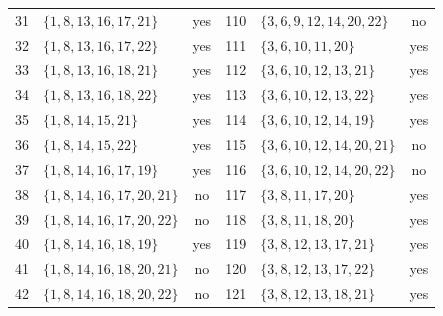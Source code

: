 \documentclass[aps,pra,reprint,superscriptaddress,longbibliography,nofootinbib,floatfix,10pt]{revtex4-2}
\theoremstyle{definition}
\begin{document}
\begin{longtable}{rlc@{\qquad}rlc}
31 & $\{1,\allowbreak 8,\allowbreak 13,\allowbreak 16,\allowbreak 17,\allowbreak 21\}$ & yes & 110 & $\{3,\allowbreak 6,\allowbreak 9,\allowbreak 12,\allowbreak 14,\allowbreak 20,\allowbreak 22\}$ & no\\
32 & $\{1,\allowbreak 8,\allowbreak 13,\allowbreak 16,\allowbreak 17,\allowbreak 22\}$ & yes & 111 & $\{3,\allowbreak 6,\allowbreak 10,\allowbreak 11,\allowbreak 20\}$ & yes\\
33 & $\{1,\allowbreak 8,\allowbreak 13,\allowbreak 16,\allowbreak 18,\allowbreak 21\}$ & yes & 112 & $\{3,\allowbreak 6,\allowbreak 10,\allowbreak 12,\allowbreak 13,\allowbreak 21\}$ & yes\\
34 & $\{1,\allowbreak 8,\allowbreak 13,\allowbreak 16,\allowbreak 18,\allowbreak 22\}$ & yes & 113 & $\{3,\allowbreak 6,\allowbreak 10,\allowbreak 12,\allowbreak 13,\allowbreak 22\}$ & yes\\
35 & $\{1,\allowbreak 8,\allowbreak 14,\allowbreak 15,\allowbreak 21\}$ & yes & 114 & $\{3,\allowbreak 6,\allowbreak 10,\allowbreak 12,\allowbreak 14,\allowbreak 19\}$ & yes\\
36 & $\{1,\allowbreak 8,\allowbreak 14,\allowbreak 15,\allowbreak 22\}$ & yes & 115 & $\{3,\allowbreak 6,\allowbreak 10,\allowbreak 12,\allowbreak 14,\allowbreak 20,\allowbreak 21\}$ & no\\
37 & $\{1,\allowbreak 8,\allowbreak 14,\allowbreak 16,\allowbreak 17,\allowbreak 19\}$ & yes & 116 & $\{3,\allowbreak 6,\allowbreak 10,\allowbreak 12,\allowbreak 14,\allowbreak 20,\allowbreak 22\}$ & no\\
38 & $\{1,\allowbreak 8,\allowbreak 14,\allowbreak 16,\allowbreak 17,\allowbreak 20,\allowbreak 21\}$ & no & 117 & $\{3,\allowbreak 8,\allowbreak 11,\allowbreak 17,\allowbreak 20\}$ & yes\\
39 & $\{1,\allowbreak 8,\allowbreak 14,\allowbreak 16,\allowbreak 17,\allowbreak 20,\allowbreak 22\}$ & no & 118 & $\{3,\allowbreak 8,\allowbreak 11,\allowbreak 18,\allowbreak 20\}$ & yes\\
40 & $\{1,\allowbreak 8,\allowbreak 14,\allowbreak 16,\allowbreak 18,\allowbreak 19\}$ & yes & 119 & $\{3,\allowbreak 8,\allowbreak 12,\allowbreak 13,\allowbreak 17,\allowbreak 21\}$ & yes\\
41 & $\{1,\allowbreak 8,\allowbreak 14,\allowbreak 16,\allowbreak 18,\allowbreak 20,\allowbreak 21\}$ & no & 120 & $\{3,\allowbreak 8,\allowbreak 12,\allowbreak 13,\allowbreak 17,\allowbreak 22\}$ & yes\\
42 & $\{1,\allowbreak 8,\allowbreak 14,\allowbreak 16,\allowbreak 18,\allowbreak 20,\allowbreak 22\}$ & no & 121 & $\{3,\allowbreak 8,\allowbreak 12,\allowbreak 13,\allowbreak 18,\allowbreak 21\}$ & yes\\

\end{longtable}
\end{document}
